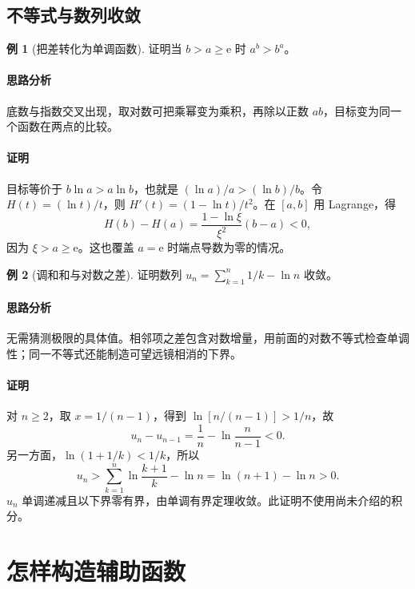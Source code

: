\documentclass[UTF8,fontset=fandol,12pt,oneside,openany]{ctexrep}
\newcommand{\ee}{\mathrm e}
\theoremstyle{definition}
\newtheorem{example}{例}[chapter]
\begin{document}
\subsection{不等式与数列收敛}
\begin{example}[把差转化为单调函数]
证明当 $b>a\ge\ee$ 时 $a^b>b^a$。
\end{example}
\paragraph{思路分析}
底数与指数交叉出现，取对数可把乘幂变为乘积，再除以正数 $ab$，目标变为同一个函数在两点的比较。
\paragraph{证明}
目标等价于 $b\ln a>a\ln b$，也就是 $(\ln a)/a>(\ln b)/b$。令 $H(t)=(\ln t)/t$，则 $H'(t)=(1-\ln t)/t^2$。在 $[a,b]$ 用 Lagrange，得
\[
H(b)-H(a)=\frac{1-\ln\xi}{\xi^2}(b-a)<0,
\]
因为 $\xi>a\ge\ee$。这也覆盖 $a=\ee$ 时端点导数为零的情况。

\begin{example}[调和和与对数之差]
证明数列 $u_n=\sum_{k=1}^n1/k-\ln n$ 收敛。
\end{example}
\paragraph{思路分析}
无需猜测极限的具体值。相邻项之差包含对数增量，用前面的对数不等式检查单调性；同一不等式还能制造可望远镜相消的下界。
\paragraph{证明}
对 $n\ge2$，取 $x=1/(n-1)$，得到 $\ln[n/(n-1)]>1/n$，故
\[
u_n-u_{n-1}=\frac1n-\ln\frac n{n-1}<0.
\]
另一方面，$\ln(1+1/k)<1/k$，所以
\[
u_n>\sum_{k=1}^n\ln\frac{k+1}{k}-\ln n
=\ln(n+1)-\ln n>0.
\]
$u_n$ 单调递减且以下界零有界，由单调有界定理收敛。此证明不使用尚未介绍的积分。

\section{怎样构造辅助函数}
\end{document}
